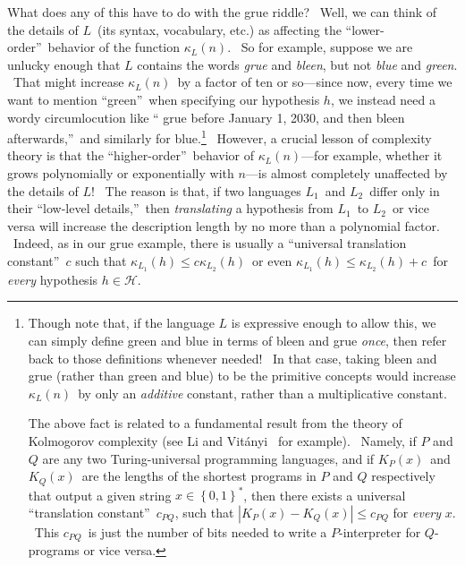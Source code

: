 \documentclass[11pt,onecolumn]{article}%
\begin{document}
What does any of this have to do with the grue riddle? \ Well, we can think of
the details of $L$\ (its syntax, vocabulary, etc.) as affecting the
\textquotedblleft lower-order\textquotedblright\ behavior of the function
$\kappa_{L}\left(  n\right)  $. \ So for example, suppose we are unlucky
enough that $L$ contains the words \textit{grue} and \textit{bleen}, but not
\textit{blue} and \textit{green}. \ That might increase $\kappa_{L}\left(
n\right)  $\ by a factor of ten or so---since now, every time we want to
mention \textquotedblleft green\textquotedblright\ when specifying our
hypothesis $h$, we instead need a wordy circumlocution like \textquotedblleft
grue before January 1, 2030, and then bleen afterwards,\textquotedblright\ and
similarly for blue.\footnote{Though note that, if the language \thinspace$L$
is expressive enough to allow this, we can simply define green and blue in
terms of bleen and grue \textit{once}, then refer back to those definitions
whenever needed! \ In that case, taking bleen and grue (rather than green and
blue) to be the primitive concepts would increase $\kappa_{L}\left(  n\right)
$\ by only an \textit{additive} constant, rather than a multiplicative
constant.
\par
The above fact is related to a fundamental result from the theory of
Kolmogorov complexity (see Li and Vit\'{a}nyi \cite{livitanyi}\ for example).
\ Namely, if $P$ and $Q$ are any two Turing-universal programming languages,
and if $K_{P}\left(  x\right)  $\ and $K_{Q}\left(  x\right)  $\ are the
lengths of the shortest programs in $P$ and $Q$ respectively that output a
given string $x\in\left\{  0,1\right\}  ^{\ast}$, then there exists a
universal \textquotedblleft translation constant\textquotedblright\ $c_{PQ}$,
such that $\left\vert K_{P}\left(  x\right)  -K_{Q}\left(  x\right)
\right\vert \leq c_{PQ}$ for \textit{every} $x$. \ This $c_{PQ}$\ is just the
number of bits needed to write a $P$-interpreter for $Q$-programs or vice
versa.} \ However, a crucial lesson of complexity theory is that the
\textquotedblleft higher-order\textquotedblright\ behavior of $\kappa
_{L}\left(  n\right)  $---for example, whether it grows polynomially or
exponentially with $n$---is almost completely unaffected by the details of
$L$! \ The reason is that, if two languages $L_{1}$\ and $L_{2}$\ differ only
in their \textquotedblleft low-level details,\textquotedblright\ then
\textit{translating} a hypothesis from $L_{1}$\ to $L_{2}$\ or vice versa will
increase the description length by no more than a polynomial factor. \ Indeed,
as in our grue example, there is usually a \textquotedblleft universal
translation constant\textquotedblright\ $c$ such that $\kappa_{L_{1}}\left(
h\right)  \leq c\kappa_{L_{2}}\left(  h\right)  $\ or even $\kappa_{L_{1}%
}\left(  h\right)  \leq\kappa_{L_{2}}\left(  h\right)  +c$\ for \textit{every}
hypothesis $h\in\mathcal{H}$.
\end{document}
